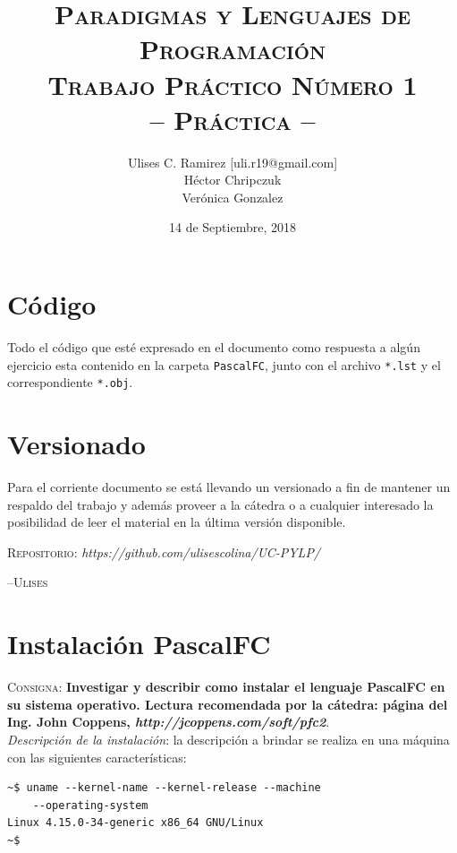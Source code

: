\documentclass{article}
\title{\textsc{Paradigmas y Lenguajes de Programaci\'on\\Trabajo Pr\'actico N\'umero 1\\-- Pr\'actica --}}
\author{Ulises C. Ramirez [uli.r19@gmail.com]\\H\'ector Chripczuk\\Ver\'onica Gonzalez}
\date{14 de Septiembre, 2018}
\begin{document}
\maketitle
{}
\newpage

\section*{C\'odigo}
Todo el c\'odigo que est\'e expresado en el documento como respuesta a alg\'un ejercicio esta contenido en la carpeta \texttt{PascalFC}, junto con el archivo \texttt{*.lst} y el correspondiente \texttt{*.obj}.\\

\section*{Versionado}
Para el corriente documento se est\'a llevando un versionado a fin de mantener un respaldo del trabajo y adem\'as proveer a la c\'atedra o a cualquier interesado la posibilidad de leer el material en la \'ultima versi\'on disponible.\\

\begin{center}
  \textsc{Repositorio}: \textit{https://github.com/ulisescolina/UC-PYLP/}
\end{center}

\hfill--\textsc{Ulises}
\tableofcontents
{}
\newpage

\section{Instalaci\'on PascalFC}
\label{sec:pascalfc}
\textsc{Consigna}: \textbf{Investigar y describir como instalar el lenguaje PascalFC en su sistema operativo. Lectura recomendada por la c\'atedra: p\'agina del Ing. John Coppens, \textit{http://jcoppens.com/soft/pfc2}}.\\

\textit{Descripci\'on de la instalaci\'on}: la descripci\'on a brindar se realiza en una m\'aquina con las siguientes caracter\'isticas:\\

\begin{lstlisting}[caption={Caracter\'isticas sistema}]
~$ uname --kernel-name --kernel-release --machine
    --operating-system
Linux 4.15.0-34-generic x86_64 GNU/Linux
~$
\end{lstlisting}
\end{document}
